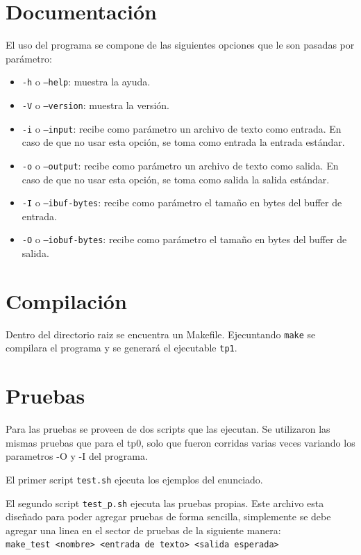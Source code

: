 \documentclass[11pt,a4paper]{article}
\begin{document}
\section{Documentación}
El uso del programa se compone de las siguientes opciones que le son pasadas por parámetro:
\begin{itemize}
	\item \texttt{-h} o \texttt{--help}: muestra la ayuda.
	\item \texttt{-V} o \texttt{--version}: muestra la versión.
	\item \texttt{-i} o \texttt{--input}: recibe como parámetro un archivo de texto como entrada. En caso de que no usar esta opción, se toma como entrada la entrada estándar.
	\item \texttt{-o} o \texttt{--output}: recibe como parámetro un archivo de texto como salida. En caso de que no usar esta opción, se toma como salida la salida estándar.
	\item \texttt{-I} o \texttt{--ibuf-bytes}: recibe como parámetro el tamaño en bytes del buffer de entrada.
	\item \texttt{-O} o \texttt{--iobuf-bytes}: recibe como parámetro el tamaño en bytes del buffer de salida.
	
\end{itemize}

\section{Compilación}
Dentro del directorio raiz se encuentra un Makefile. Ejecuntando \texttt{make} se compilara el programa y se generará el ejecutable \texttt{tp1}.

\section{Pruebas}
Para las pruebas se proveen de dos scripts que las ejecutan.
Se utilizaron las mismas pruebas que para el tp0, solo que fueron corridas varias veces variando los parametros -O y -I del programa.

El primer script \texttt{test.sh} ejecuta los ejemplos del enunciado.

El segundo script \texttt{test\_p.sh} ejecuta las pruebas propias.
Este archivo esta diseñado para poder agregar pruebas de forma sencilla, simplemente se debe agregar una linea en el sector de pruebas de la siguiente manera:\\

\texttt{make\_test <nombre> <entrada de texto> <salida esperada>}
\end{document}
